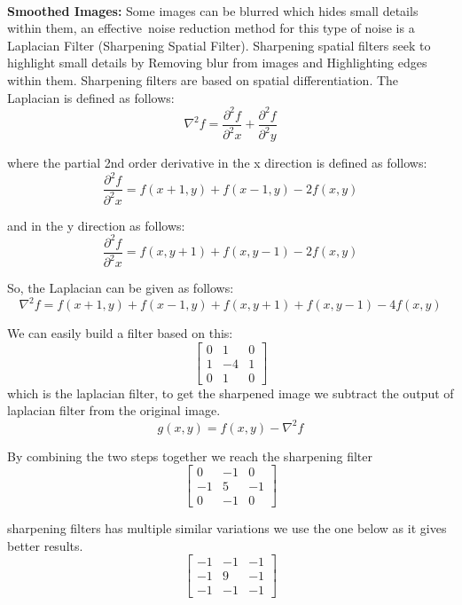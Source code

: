 \paragraph{}
\textbf{Smoothed Images:}\newline
Some images can be blurred which hides small details within them, an effective noise reduction method for this type of noise is a Laplacian Filter (Sharpening Spatial Filter).\newline
Sharpening spatial filters seek to highlight small details by Removing blur from images and Highlighting edges within them.\newline
Sharpening filters are based on spatial differentiation.\newline
The Laplacian is defined as follows:
\[\nabla^{2} f = \frac{\partial^{2}f}{\partial^{2}x} + \frac{\partial^{2}f}{\partial^{2}y}\]

where the partial 2nd order derivative in the x direction is defined as follows:
\[\frac{\partial^{2}f}{\partial^{2}x} = f(x+1, y) + f(x-1, y) - 2f(x, y)\]

and in the y direction as follows:
\[\frac{\partial^{2}f}{\partial^{2}x} = f(x, y+1) + f(x, y-1) - 2f(x, y)\]

So, the Laplacian can be given as follows:
\[\nabla^{2} f = f(x+1, y) + f(x-1, y) + f(x, y+1) + f(x, y-1) - 4f(x, y)\]

We can easily build a filter based on this:
\[
\begin{bmatrix}
0 & 1 & 0 \\
1 & -4 & 1 \\
0 & 1 & 0
\end{bmatrix} \]
which is the laplacian filter, to get the sharpened image we subtract the output of laplacian filter from the original image.
\[g(x, y) = f(x, y) - \nabla^{2} f\]

By combining the two steps together we reach the sharpening filter
\[
\begin{bmatrix}
0 & -1 & 0 \\
-1 & 5 & -1 \\
0 & -1 & 0
\end{bmatrix} \]

sharpening filters has multiple similar variations we use the one below as it gives better results.
\[
\begin{bmatrix}
-1 & -1 & -1 \\
-1 & 9 & -1 \\
-1 & -1 & -1
\end{bmatrix} \]

